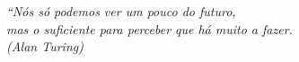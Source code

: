 \begin{epigrafe}
    \vspace*{\fill}
	\begin{flushright}
		\textit{``Nós só podemos ver um pouco do futuro,  \\
		mas o suficiente para perceber que há muito a fazer. \\
		(Alan Turing)}
	\end{flushright}
\end{epigrafe}
